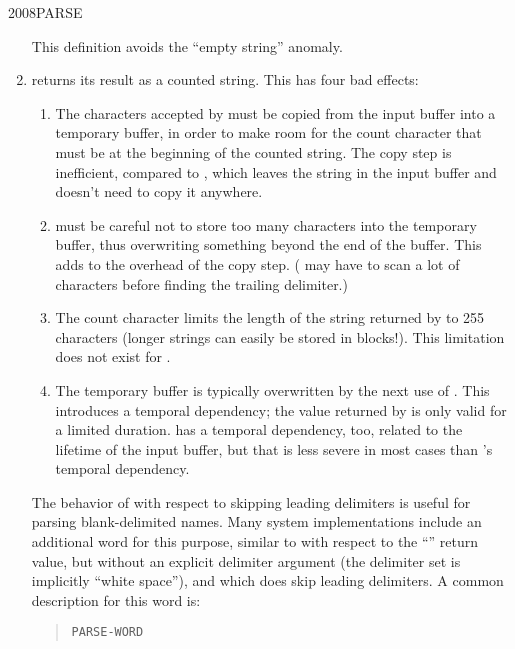 \begin{worddef}{2008}{PARSE}
\begin{defer}
\begin{enumerate}
			This definition avoids the ``empty string'' anomaly.

		\item {} returns its result as a counted string.
			This has four bad effects:

			\begin{enumerate}
			\item The characters accepted by  must be
				copied from the input buffer into a temporary buffer,
				in order to make room for the count character that
				must be at the beginning of the counted string. The
				copy step is inefficient, compared to ,
				which leaves the string in the input buffer and doesn't
				need to copy it anywhere.

			\item {} must be careful not to store too many
				characters into the temporary buffer, thus overwriting
				something beyond the end of the buffer. This adds to
				the overhead of the copy step. ( may have
				to scan a lot of characters before finding the trailing
				delimiter.)

			\item The count character limits the length of the string
				returned by  to 255 characters (longer
				strings can easily be stored in blocks!). This
				limitation does not exist for .

			\item The temporary buffer is typically overwritten by the
				next use of . This introduces a temporal
				dependency; the value returned by  is only
				valid for a limited duration.  has a
				temporal dependency, too, related to the lifetime of
				the input buffer, but that is less severe in most
				cases than 's temporal dependency.
			\end{enumerate}

			The behavior of  with respect to skipping
			leading delimiters is useful for parsing blank-delimited
			names. Many system implementations include an additional
			word for this purpose, similar to  with respect
			to the ``'' return value, but without an
			explicit delimiter argument (the delimiter set is implicitly
			``white space''), and which does skip leading delimiters. A
			common description for this word is:

			\begin{quote}
				\texttt{PARSE-WORD} \qquad
					 \\


\end{quote}
\end{enumerate}
\end{defer}
\end{worddef}

